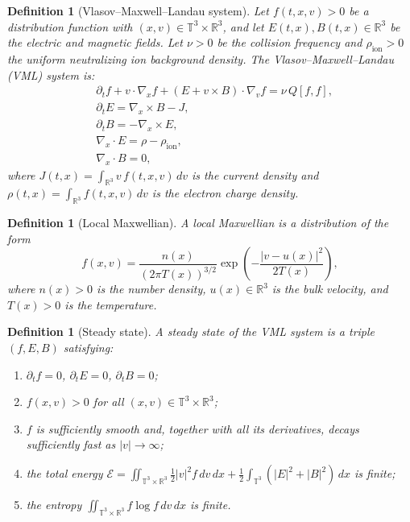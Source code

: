 \documentclass[11pt]{article}
\newcommand{\R}{\mathbb{R}}
\newcommand{\T}{\mathbb{T}}
\newtheorem{definition}[theorem]{Definition}
\begin{document}
\begin{definition}[Vlasov--Maxwell--Landau system]
\label{def:vml}
Let $f(t, x, v) > 0$ be a distribution function with $(x, v) \in \T^3 \times \R^3$, and let $E(t, x), B(t, x) \in \R^3$ be the electric and magnetic fields. Let $\nu > 0$ be the collision frequency and $\rho_{\mathrm{ion}} > 0$ the uniform neutralizing ion background density. The \emph{Vlasov--Maxwell--Landau (VML) system} is:
\begin{align}
\label{eq:vlasov}
&\partial_t f + v \cdot \nabla_x f + (E + v \times B) \cdot \nabla_v f = \nu \, Q[f, f], \\
\label{eq:ampere}
&\partial_t E = \nabla_x \times B - J, \\
\label{eq:faraday}
&\partial_t B = -\nabla_x \times E, \\
\label{eq:gauss}
&\nabla_x \cdot E = \rho - \rho_{\mathrm{ion}}, \\
\label{eq:divB}
&\nabla_x \cdot B = 0,
\end{align}
where $J(t,x) = \int_{\R^3} v \, f(t, x, v) \, dv$ is the current density and $\rho(t,x) = \int_{\R^3} f(t, x, v) \, dv$ is the electron charge density.
\end{definition}

\begin{definition}[Local Maxwellian]
\label{def:local_maxwellian}
A \emph{local Maxwellian} is a distribution of the form
\[
f(x, v) = \frac{n(x)}{(2\pi T(x))^{3/2}} \exp\!\left(-\frac{|v - u(x)|^2}{2T(x)}\right),
\]
where $n(x) > 0$ is the number density, $u(x) \in \R^3$ is the bulk velocity, and $T(x) > 0$ is the temperature.
\end{definition}

\begin{definition}[Steady state]
\label{def:steady_state}
A \emph{steady state} of the VML system is a triple $(f, E, B)$ satisfying:
\begin{enumerate}[label=(\roman*)]
\item $\partial_t f = 0$, $\partial_t E = 0$, $\partial_t B = 0$;
\item $f(x, v) > 0$ for all $(x, v) \in \T^3 \times \R^3$;
\item $f$ is sufficiently smooth and, together with all its derivatives, decays sufficiently fast as $|v| \to \infty$;
\item the total energy $\mathcal{E} = \iint_{\T^3 \times \R^3} \frac{1}{2}|v|^2 f \, dv \, dx + \frac{1}{2}\int_{\T^3}(|E|^2 + |B|^2) \, dx$ is finite;
\item the entropy $\iint_{\T^3 \times \R^3} f \log f \, dv \, dx$ is finite.
\end{enumerate}
\end{definition}
\end{document}
